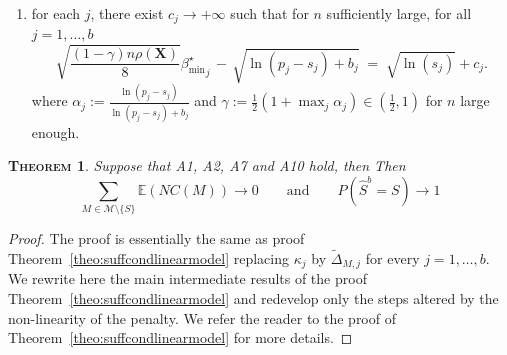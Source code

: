 \documentclass[aos]{imsart}
\theoremstyle{plain}
\newtheorem{thm}{\textsc{Theorem}}[section]
\newcommand{\E}{\mathbb{E}}
\newcommand{\bs}{\boldsymbol}
\begin{document}
\begin{supplement}
\begin{enumerate}[start=9,label={(A\arabic*)}]
\item  for each $j$, there exist $c_{j}\to +\infty$ such that for $n$ sufficiently large, for all $j=1,\ldots,b$
    \begin{equation}\label{cond:suffIIregnonlinpen}
        \sqrt{\frac{(1-\gamma) n\rho(\bs X)}{8}}{{\beta_{\min}^{\star}}_j} \,- \,\sqrt{\ln(p_j-s_j) + b_{j}} \;=\; \sqrt{\ln(s_j)} + c_{j} .
    \end{equation}
where $\alpha_j:=\frac{\ln(p_j-s_j)}{\ln(p_j-s_j) + b_{j}}$ and $\gamma:=\frac12(1+\max_j \alpha_j)\in (\tfrac12,1)$ for $n$ large enough.
\end{enumerate}
\begin{thm}\label{theo:suffcondlinearmodelnonlinpen}
Suppose that A1, A2, A7 and A10 hold, then 
Then $$\sum_{M \in \mathcal{M}\setminus \{S\}}\E\left(NC(M)\right)\to 0 \qquad \mbox{and} \qquad P(\widehat{S}^b = S) \to 1$$
\end{thm}

\begin{proof}
The proof is essentially the same as proof Theorem~\ref{theo:suffcondlinearmodel} replacing $\kappa_j$ by $\tilde{\Delta}_{M, j}$ for every $j=1,\ldots,b$. We rewrite here the main intermediate results of the proof Theorem~\ref{theo:suffcondlinearmodel} and redevelop only the steps altered by the non-linearity of the penalty. We refer the reader to the proof of Theorem~\ref{theo:suffcondlinearmodel} for more details.


\end{proof}
\end{supplement}
\end{document}
